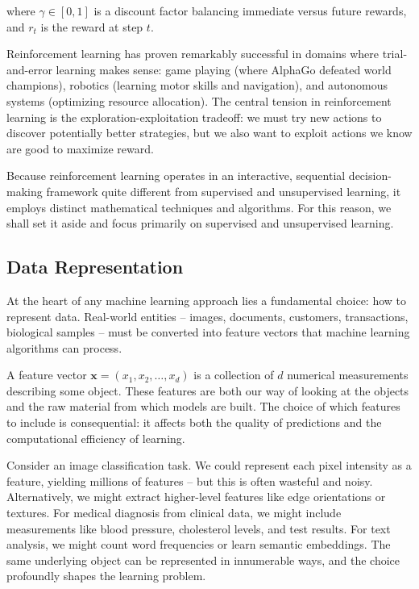 where $\gamma \in [0,1]$ is a discount factor balancing immediate versus future rewards, and $r_t$ is the reward at step $t$.

Reinforcement learning has proven remarkably successful in domains where trial-and-error learning makes sense: game playing (where AlphaGo defeated world champions), robotics (learning motor skills and navigation), and autonomous systems (optimizing resource allocation). The central tension in reinforcement learning is the exploration-exploitation tradeoff: we must try new actions to discover potentially better strategies, but we also want to exploit actions we know are good to maximize reward.

Because reinforcement learning operates in an interactive, sequential decision-making framework quite different from supervised and unsupervised learning, it employs distinct mathematical techniques and algorithms. For this reason, we shall set it aside and focus primarily on supervised and unsupervised learning.

\subsection*{Data Representation}
At the heart of any machine learning approach lies a fundamental choice: how to represent data. Real-world entities -- images, documents, customers, transactions, biological samples -- must be converted into feature vectors that machine learning algorithms can process.

A \alert{feature vector} $\mathbf{x} = (x_1, x_2, \ldots, x_d)$ is a collection of $d$ numerical measurements describing some object. These features are both our way of looking at the objects and the raw material from which models are built. The choice of which features to include is consequential: it affects both the quality of predictions and the computational efficiency of learning.

Consider an image classification task. We could represent each pixel intensity as a feature, yielding millions of features -- but this is often wasteful and noisy. Alternatively, we might extract higher-level features like edge orientations or textures. For medical diagnosis from clinical data, we might include measurements like blood pressure, cholesterol levels, and test results. For text analysis, we might count word frequencies or learn semantic embeddings. The same underlying object can be represented in innumerable ways, and the choice profoundly shapes the learning problem.

